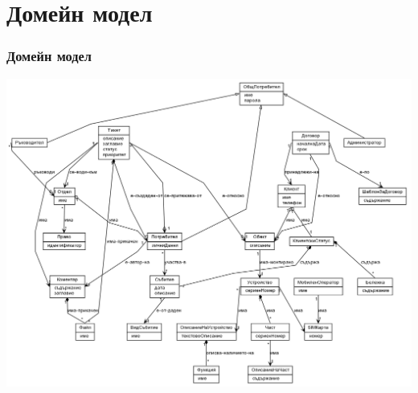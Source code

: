 \documentclass{beamer}
\begin{document}
\section{Домейн модел}
\begin{frame}
  \frametitle{Домейн модел}
  \includegraphics[width= 0.7\paperwidth]{../diagrams/domain.png}
\end{frame}
\end{document}
